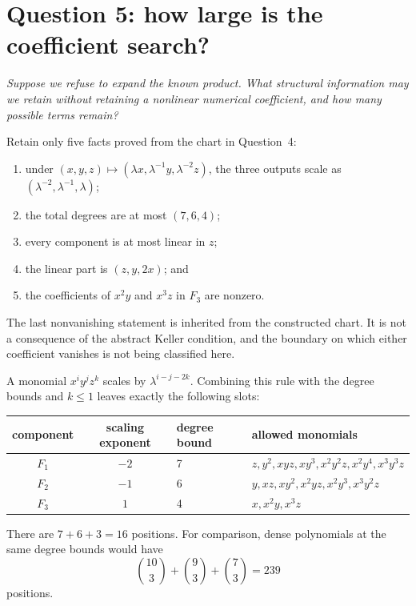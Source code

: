 \documentclass[11pt,a4paper]{article}
\numberwithin{equation}{section}
\theoremstyle{definition}
\theoremstyle{remark}
\newenvironment{userquestion}
  {\par\medskip\noindent{\color{userblue}\bfseries USER}\quad
   \begin{minipage}[t]{0.84\linewidth}\itshape}
  {\end{minipage}\par\medskip}
\newenvironment{modelanswer}
  {\par\smallskip\noindent{\color{modelgreen}\bfseries MODEL}\par\smallskip}
  {\par\medskip}
\begin{document}
\section{Question 5: how large is the coefficient search?}

\begin{userquestion}
Suppose we refuse to expand the known product.  What structural information
may we retain without retaining a nonlinear numerical coefficient, and how
many possible terms remain?
\end{userquestion}

\begin{modelanswer}
Retain only five facts proved from the chart in Question~4:
\begin{enumerate}
\item under \((x,y,z)\mapsto(\lambda x,\lambda^{-1}y,\lambda^{-2}z)\),
  the three outputs scale as \((\lambda^{-2},\lambda^{-1},\lambda)\);
\item the total degrees are at most \((7,6,4)\);
\item every component is at most linear in \(z\);
\item the linear part is \((z,y,2x)\); and
\item the coefficients of \(x^2y\) and \(x^3z\) in \(F_3\) are nonzero.
\end{enumerate}
The last nonvanishing statement is inherited from the constructed chart.  It
is not a consequence of the abstract Keller condition, and the boundary on
which either coefficient vanishes is not being classified here.

A monomial \(x^iy^jz^k\) scales by \(\lambda^{i-j-2k}\).  Combining this
rule with the degree bounds and \(k\le1\) leaves exactly the following slots:
\begin{center}
\small
\begin{tabularx}{\linewidth}{@{}cclX@{}}
\toprule
component&scaling exponent&degree bound&allowed monomials\\
\midrule
\(F_1\)&\(-2\)&7&
\(z,y^2,xyz,xy^3,x^2y^2z,x^2y^4,x^3y^3z\)\\
\(F_2\)&\(-1\)&6&
\(y,xz,xy^2,x^2yz,x^2y^3,x^3y^2z\)\\
\(F_3\)&\(1\)&4&
\(x,x^2y,x^3z\)\\
\bottomrule
\end{tabularx}
\end{center}
There are \(7+6+3=16\) positions.  For comparison, dense polynomials at the
same degree bounds would have
\[
  \binom{10}{3}+\binom{9}{3}+\binom{7}{3}=239
\]
positions.


\end{modelanswer}
\end{document}
